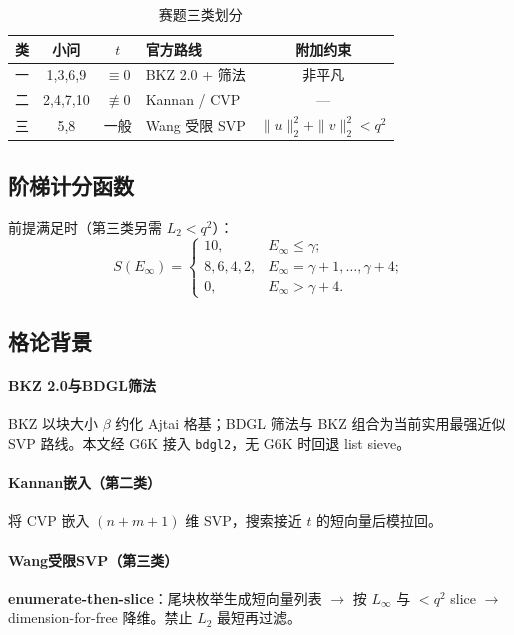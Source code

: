 \documentclass[12pt,a4paper]{ctexart}
\begin{document}
\begin{table}[htbp]
  \centering
  \caption{赛题三类划分}
  \label{tab:taxonomy}
  \begin{tabular}{ccclc}
    \toprule
    类 & 小问 & $t$ & 官方路线 & 附加约束 \\
    \midrule
    一 & 1,3,6,9 & $\equiv 0$ & BKZ 2.0 + 筛法 & 非平凡 \\
    二 & 2,4,7,10 & $\not\equiv 0$ & Kannan / CVP & --- \\
    三 & 5,8 & 一般 & Wang 受限 SVP & $\|u\|_2^2+\|v\|_2^2<q^2$ \\
    \bottomrule
  \end{tabular}
\end{table}

\subsection{阶梯计分函数}

前提满足时（第三类另需 $L_2<q^2$）：
\begin{equation}\label{eq:score}
  S(E_\infty)=
  \begin{cases}
    10, & E_\infty\le\gamma;\\
    8,6,4,2, & E_\infty=\gamma{+}1,{\ldots},\gamma{+}4;\\
    0, & E_\infty>\gamma{+}4.
  \end{cases}
\end{equation}

\subsection{格论背景}

\paragraph{BKZ 2.0与BDGL筛法}
BKZ 以块大小 $\beta$ 约化 Ajtai 格基\cite{chen2011}；BDGL 筛法\cite{becker2016}与 BKZ 组合为当前实用最强近似 SVP 路线。本文经 G6K 接入 \texttt{bdgl2}，无 G6K 时回退 list sieve。

\paragraph{Kannan嵌入（第二类）}
将 CVP 嵌入 $(n{+}m{+}1)$ 维 SVP，搜索接近 $t$ 的短向量后模拉回\cite{kannan1987}。

\paragraph{Wang受限SVP（第三类）}
\textbf{enumerate-then-slice}：尾块枚举生成短向量列表 $\to$ 按 $L_{\infty}$ 与 $<q^2$ slice $\to$ dimension-for-free 降维\cite{wang2025}。禁止 $L_2$ 最短再过滤。
\end{document}
